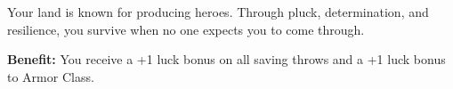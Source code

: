 
Your land is known for producing heroes. Through pluck, determination, and resilience, you survive when no one expects you to come through.

\textbf{Benefit:} You receive a +1 luck bonus on all saving throws and a +1 luck bonus to Armor Class.